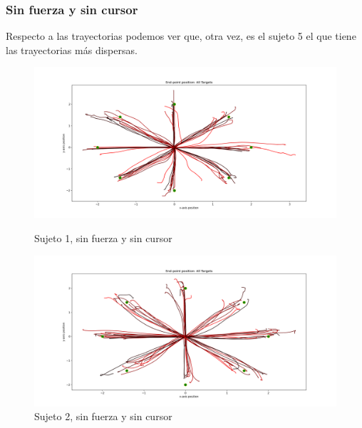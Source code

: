 \documentclass[a4paper,11pt, oneside]{book}
\begin{document}
\subsubsection{Sin fuerza y sin cursor}

Respecto a las trayectorias podemos ver que, otra vez, es el sujeto 5 el que tiene las trayectorias más dispersas.
\begin{figure}[h]
	\begin{minipage}[b]{0.5\linewidth}
		\centering
		\includegraphics[width=\linewidth]{sujeto1/no_force_no_cursor/trayectorias}
		\caption{Sujeto 1, sin fuerza y sin cursor}
		\label{fig:figura1}
	\end{minipage}
	\hspace{0.5cm}
	\begin{minipage}[b]{0.5\linewidth}
		\centering
		\includegraphics[width=\linewidth]{sujeto2/no_force_no_cursor/trayectorias}
		\caption{Sujeto 2, sin fuerza y sin cursor}
		\label{fig:figura2}
	\end{minipage}
\end{figure}
\end{document}
